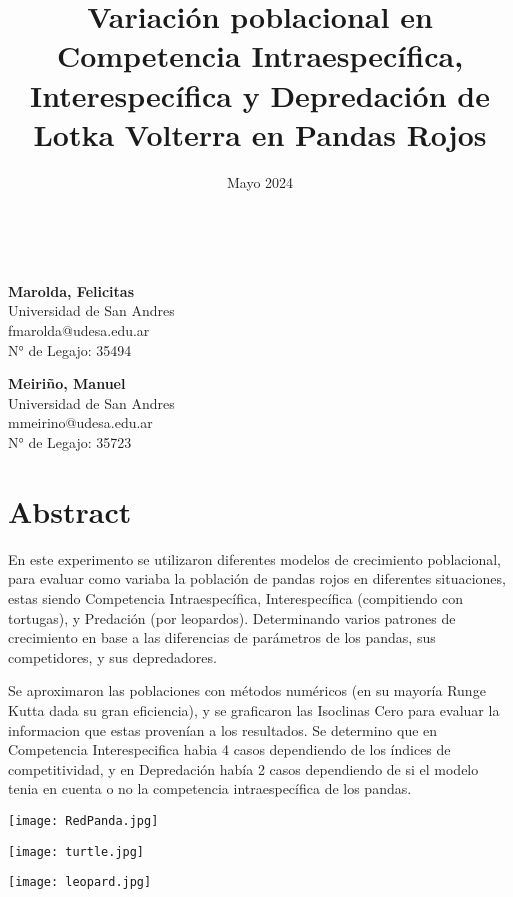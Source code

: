 \documentclass{article}
\title {Variación poblacional en Competencia Intraespecífica, Interespecífica y Depredación de Lotka Volterra en Pandas Rojos}
\date{Mayo 2024}
\makeatletter
\renewcommand{\maketitle}{
    \begin{center}
        {\huge \@title}\\
        \vspace{10pt} 
        {\Large \@date}
    \end{center}
}
\makeatother
\begin{document}

\maketitle
\thispagestyle{plain}

\begin{center}

\large
\textbf{Marolda, Felicitas}\\
Universidad de San Andres\\
fmarolda@udesa.edu.ar\\
N° de Legajo: 35494\\
\vspace{1\baselineskip}

\large
\textbf{Meiriño, Manuel}\\
Universidad de San Andres\\
mmeirino@udesa.edu.ar\\
N° de Legajo: 35723
\end{center}

\vspace{0.5cm}

\section*{Abstract}
\normalsize

\noindent En este experimento se utilizaron diferentes modelos de crecimiento poblacional, para evaluar como variaba la población de pandas rojos en diferentes situaciones, estas siendo Competencia Intraespecífica, Interespecífica (compitiendo con tortugas), y Predación (por leopardos). Determinando varios patrones de crecimiento en base a las diferencias de parámetros de los pandas, sus competidores, y sus depredadores. 
\vspace{\baselineskip}

\noindent Se aproximaron las poblaciones con métodos numéricos (en su mayoría Runge Kutta dada su gran eficiencia), y se graficaron las Isoclinas Cero para evaluar la informacion que estas provenían a los resultados. Se determino que en Competencia Interespecifica habia 4 casos dependiendo de los índices de competitividad, y en Depredación había 2 casos dependiendo de si el modelo tenia en cuenta o no la competencia intraespecífica de los pandas. \vspace{\baselineskip}

\noindent %
\begin{minipage}[t]{0.32\textwidth}
    \centering
    \texttt{[image: RedPanda.jpg]} %
\end{minipage}%
\hfill
\begin{minipage}[t]{0.32\textwidth}
    \centering
    \texttt{[image: turtle.jpg]} %
\end{minipage}%
\hfill
\begin{minipage}[t]{0.32\textwidth}
    \centering
    \texttt{[image: leopard.jpg]} %
\end{minipage}
\end{document}
